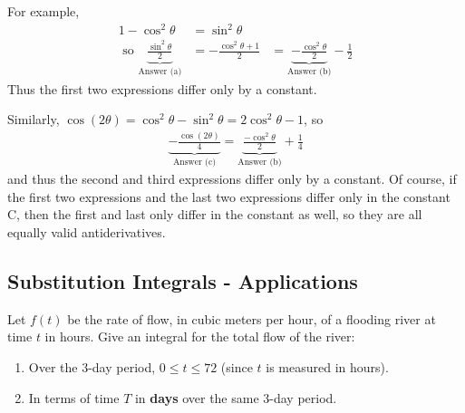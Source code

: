 \begin{enumerate}[1.]
\begin{multicols}{2}
\begin{Solution}
\begin{enumerate}[(a)]
For example, 
\begin{align*}
1-\cos^2 \theta & = \sin^2 \theta  \\
\mbox{ so } \underbrace{\frac{\sin^2 \theta}{ 2 }}_{\mbox{Answer (a)}}
&  = -\frac{\cos^2 \theta + 1 }{2}
& = \underbrace{-\frac{\cos^2 \theta }{2}}_{\mbox{Answer (b)}} - \frac{1}{2}
\end{align*}
Thus the first two expressions differ only by a constant.

Similarly, $\cos(2\theta) = \cos^2 \theta - \sin^2 \theta = 2 \cos^2 \theta - 1$, so 
\begin{align*}
\underbrace{-\frac{\cos (2\theta)}{ 4}}_{\mbox{Answer (c)}}
= \underbrace{\frac{-\cos^2 \theta}{ 2}}_{\mbox{Answer (b)}} +\frac{ 1}{4}
\end{align*}
and thus the second and third expressions differ only by a
constant. Of course, if the first two expressions and the last two
expressions differ only in the constant C, then the first and last
only differ in the constant as well, so they are all equally valid
antiderivatives.
    \end{enumerate}
  \end{Solution}
\end{multicols}

\hrulefill
\subsection*{Substitution Integrals - Applications}

\begin{multicols}{2}
\item
  \begin{Question}
    Let $f(t)$ be the rate of flow, in cubic meters per hour, of a
    flooding river at time $t$ in hours. Give an integral for the total
    flow of the river:
    \begin{enumerate}
    \item Over the 3-day period, $0 \le t \le 72$ (since $t$ is
      measured in hours).
    \item In terms of time $T$ in {\bf days} over the same 3-day
      period.
    \end{enumerate}
  \end{Question}


\end{multicols}
\end{enumerate}
